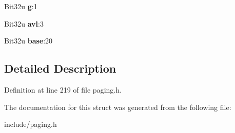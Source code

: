 \begin{DoxyCompactItemize}
\item 
\hypertarget{structX86__PageEntryBlock_a282678ef5c0a3146c4f1dede36b39184}{Bit32u {\bfseries g}\-:1}\label{structX86__PageEntryBlock_a282678ef5c0a3146c4f1dede36b39184}

\item 
\hypertarget{structX86__PageEntryBlock_a3a3c575ff0e58b07ea6184eb35bb214d}{Bit32u {\bfseries avl}\-:3}\label{structX86__PageEntryBlock_a3a3c575ff0e58b07ea6184eb35bb214d}

\item 
\hypertarget{structX86__PageEntryBlock_ae2b92de4c563ce709fee89077e9fc262}{Bit32u {\bfseries base}\-:20}\label{structX86__PageEntryBlock_ae2b92de4c563ce709fee89077e9fc262}

\end{DoxyCompactItemize}


\subsection{Detailed Description}


Definition at line 219 of file paging.\-h.



The documentation for this struct was generated from the following file\-:\begin{DoxyCompactItemize}
\item 
include/paging.\-h\end{DoxyCompactItemize}
